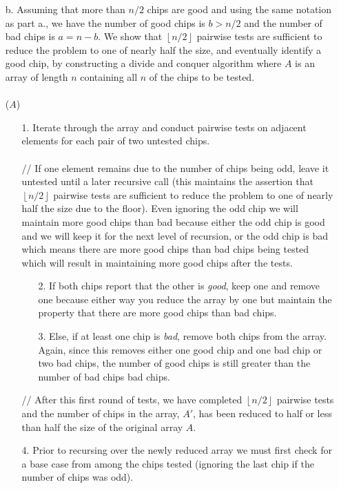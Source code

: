 \documentclass[11pt]{article}
\theoremstyle{nonumberplain}
\begin{document}
\begin{enumerate}
\item[b.] Assuming that more than $n/2$ chips are good and using the same notation as part a., we have the number of good chips is $b>n/2$ and the number of bad chips is $a=n-b$. We show that $\left \lfloor{n/2} \right \rfloor$ pairwise tests are sufficient to reduce the problem to one of nearly half the size, and eventually identify a good chip, by constructing a divide and conquer algorithm where $A$ is an array of length $n$ containing all $n$ of the chips to be tested. \\
\\
($A$)
\begin{itemize}
    \item[1.] Iterate through the array and conduct pairwise tests on adjacent elements for each pair of two untested chips. \\
    \\
    // If one element remains due to the number of chips being odd, leave it untested until a later recursive call (this maintains the assertion that $\left \lfloor{n/2} \right \rfloor$ pairwise tests are sufficient to reduce the problem to one of nearly half the size due to the floor). Even ignoring the odd chip we will maintain more good chips than bad because either the odd chip is good and we will keep it for the next level of recursion, or the odd chip is bad which means there are more good chips than bad chips being tested which will result in maintaining more good chips after the tests. \\
    \begin{itemize}
        \item[2.] If both chips report that the other is \emph{good}, keep one and remove one because either way you reduce the array by one but maintain the property that there are more good chips than bad chips.
        \item[3.] Else, if at least one chip is \emph{bad}, remove both chips from the array. Again, since this removes either one good chip and one bad chip or two bad chips, the number of good chips is still greater than the number of bad chips bad chips. \\
    \end{itemize}
    // After this first round of tests, we have completed $\left \lfloor{n/2} \right \rfloor$ pairwise tests and the number of chips in the array, $A'$, has been reduced to half or less than half the size of the original array $A$. \\
    \item[4.] Prior to recursing over the newly reduced array we must first check for a base case from among the chips tested (ignoring the last chip if the number of chips was odd).

\end{itemize}
\end{enumerate}
\end{document}

